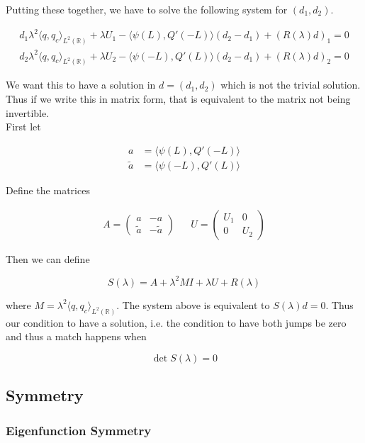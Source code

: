 \documentclass[12pt]{article}
\def\R{{\mathbb R}}
\begin{document}
Putting these together, we have to solve the following system for $(d_1, d_2)$.

\begin{align*}
d_1 \lambda^2 \langle q, q_c \rangle_{L^2(\R)} + \lambda U_1 - \langle \psi(L), Q'(-L) \rangle(d_2 - d_1) + (R(\lambda)d)_1 = 0\\
d_2 \lambda^2 \langle q, q_c \rangle_{L^2(\R)} + \lambda U_2 - \langle \psi(-L), Q'(L) \rangle(d_2 - d_1) + (R(\lambda)d)_2 = 0
\end{align*}

We want this to have a solution in $d = (d_1, d_2)$ which is not the trivial solution. Thus if we write this in matrix form, that is equivalent to the matrix not being invertible.\\

First let

\begin{align*}
a &= \langle \psi(L), Q'(-L) \rangle \\
\tilde{a} &=\langle \psi(-L), Q'(L) \rangle
\end{align*}

Define the matrices

\begin{align*}
A = \begin{pmatrix}
a & -a \\ \tilde{a} & -\tilde{a} 
\end{pmatrix} &&
U = \begin{pmatrix}
U_1 & 0 \\ 0 & U_2 
\end{pmatrix} 
\end{align*}

Then we can define

\[
S(\lambda) = A + \lambda^2 MI + \lambda U + R(\lambda) 
\]

where $M = \lambda^2 \langle q, q_c \rangle_{L^2(\R)}$. The system above is equivalent to $S(\lambda)d = 0$. Thus our condition to have a solution, i.e. the condition to have both jumps be zero and thus a match happens when

\[
\det S(\lambda) = 0
\]

\subsection*{Symmetry}

\subsubsection*{Eigenfunction Symmetry}
\end{document}
